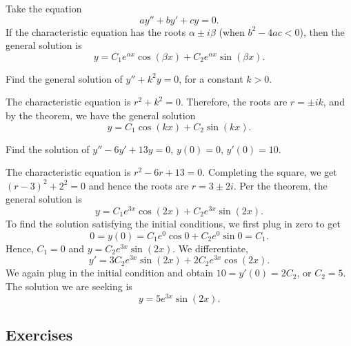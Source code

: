 \begin{theorem}
Take the equation
\begin{equation*}
ay'' + by' + cy = 0 .
\end{equation*}
If the characteristic equation has the roots $\alpha \pm i \beta$
(when $b^2 - 4ac < 0$),
then the general solution is
\begin{equation*}
y = C_1 e^{\alpha x} \cos (\beta x) + C_2 e^{\alpha x} \sin (\beta x) .
\end{equation*}
\end{theorem}

\begin{example} \label{example:sincossecondorder}
Find the general solution of $y'' + k^2 y = 0$, for a constant
$k > 0$.

The characteristic equation is $r^2 + k^2 = 0$.  Therefore,
the roots are $r = \pm ik$, and by the theorem, we have the general solution
\begin{equation*}
y = C_1 \cos (kx) + C_2 \sin (kx) .
\end{equation*}
\end{example}

\begin{example}
Find the solution of $y'' - 6 y' + 13 y = 0$, $y(0) = 0$, $y'(0) =
10$.

The characteristic equation is $r^2 - 6 r + 13 = 0$.  Completing the
square, we get ${(r-3)}^2 + 2^2 = 0$ and hence the roots are
$r = 3 \pm 2i$.
Per the theorem, the general solution is
\begin{equation*}
y = C_1 e^{3x} \cos (2x) + C_2 e^{3x} \sin (2x) .
\end{equation*}
To find the solution satisfying the initial conditions, we first plug in zero
to get
\begin{equation*}
0 = y(0) = C_1 e^{0} \cos 0 + C_2 e^{0} \sin 0  = C_1 .
\end{equation*}
Hence, $C_1 = 0$ and $y = C_2 e^{3x} \sin (2x)$.  We differentiate,
\begin{equation*}
y' = 3C_2 e^{3x} \sin (2x) + 2C_2 e^{3x} \cos (2x) .
\end{equation*}
We again plug in the initial condition and obtain $10 = y'(0) = 2C_2$, or
$C_2 = 5$.  The solution we are seeking is
\begin{equation*}
y = 5 e^{3x} \sin (2x) .
\end{equation*}
\end{example}

\subsection{Exercises}

